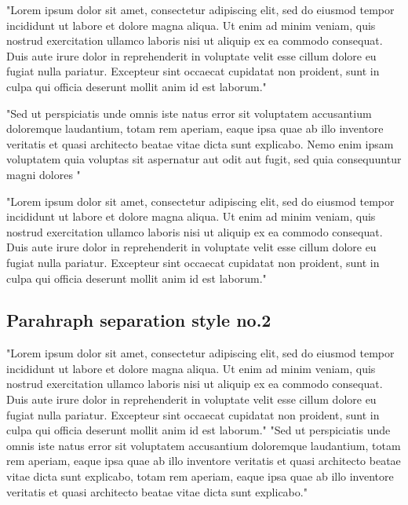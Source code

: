 \documentclass[wide]{cluu}
\begin{document}
"Lorem ipsum dolor sit amet, consectetur adipiscing elit, sed do eiusmod tempor incididunt ut labore et dolore magna aliqua. Ut enim ad minim veniam, quis nostrud exercitation ullamco laboris nisi ut aliquip ex ea commodo consequat. Duis aute irure dolor in reprehenderit in voluptate velit esse cillum dolore eu fugiat nulla pariatur. Excepteur sint occaecat cupidatat non proident, sunt in culpa qui officia deserunt mollit anim id est laborum."

"Sed ut perspiciatis unde omnis iste natus error sit voluptatem accusantium doloremque laudantium, totam rem aperiam, eaque ipsa quae ab illo inventore veritatis et quasi architecto beatae vitae dicta sunt explicabo. Nemo enim ipsam voluptatem quia voluptas sit aspernatur aut odit aut fugit, sed quia consequuntur magni dolores "

"Lorem ipsum dolor sit amet, consectetur adipiscing elit, sed do eiusmod tempor incididunt ut labore et dolore magna aliqua. Ut enim ad minim veniam, quis nostrud exercitation ullamco laboris nisi ut aliquip ex ea commodo consequat. Duis aute irure dolor in reprehenderit in voluptate velit esse cillum dolore eu fugiat nulla pariatur. Excepteur sint occaecat cupidatat non proident, sunt in culpa qui officia deserunt mollit anim id est laborum."



\subsection{Parahraph separation style no.2}

"Lorem ipsum dolor sit amet, consectetur adipiscing elit, sed do eiusmod tempor incididunt ut labore et dolore magna aliqua. Ut enim ad minim veniam, quis nostrud exercitation ullamco laboris nisi ut aliquip ex ea commodo consequat. Duis aute irure dolor in reprehenderit in voluptate velit esse cillum dolore eu fugiat nulla pariatur. Excepteur sint occaecat cupidatat non proident, sunt in culpa qui officia deserunt mollit anim id est laborum."
\newline
\newline
"Sed ut perspiciatis unde omnis iste natus error sit voluptatem accusantium doloremque laudantium, totam rem aperiam, eaque ipsa quae ab illo inventore veritatis et quasi architecto beatae vitae dicta sunt explicabo, totam rem aperiam, eaque ipsa quae ab illo inventore veritatis et quasi architecto beatae vitae dicta sunt explicabo."



\setlength{\bibsep}{7pt}

\end{document}
